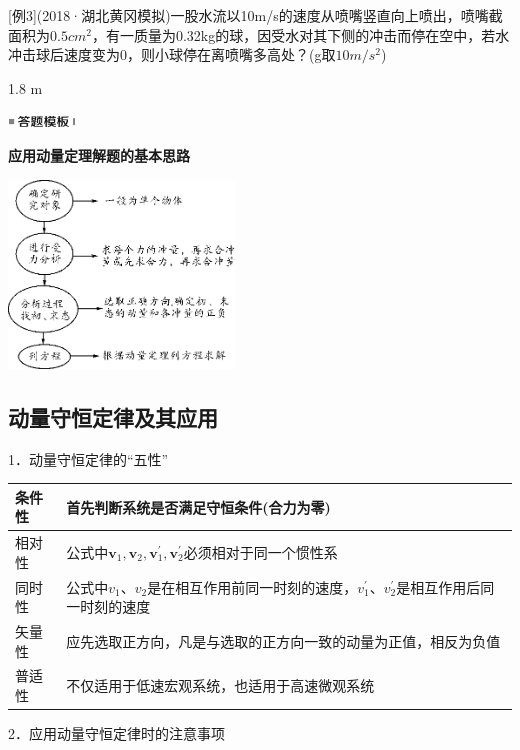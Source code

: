 {[}例3{]}(2018·湖北黄冈模拟)一股水流以10m/s的速度从喷嘴竖直向上喷出，喷嘴截面积为$0.5 cm^2$，有一质量为0.32kg的球，因受水对其下侧的冲击而停在空中，若水冲击球后速度变为0，则小球停在离喷嘴多高处？(g取$10m/s^2$)
\begin{solution}
	1.8 m
\end{solution}

\begin{center}\includegraphics[width=0.70764in,height=0.12292in]{media/image25.png}

\textbf{应用动量定理解题的基本思路}
\end{center}


\begin{center}\includegraphics[width=2.36806in,height=1.97153in]{media/image250.png}\end{center}

	

\subsection{动量守恒定律及其应用}

1．动量守恒定律的``五性''

\begin{longtable}[]{@{}ll@{}}
\toprule
条件性 & 首先判断系统是否满足守恒条件(合力为零)\tabularnewline
\midrule
\endhead
相对性 & 公式中$\boldsymbol{v}_{1}, \boldsymbol{v}_{2}, \boldsymbol{v}_{1}^{\prime}, \boldsymbol{v}_{2}^{\prime}$必须相对于同一个惯性系\tabularnewline
同时性 &
公式中$v_1$、$v_2$是在相互作用前同一时刻的速度，$v_1^\prime$、$v_2^\prime$是相互作用后同一时刻的速度\tabularnewline
矢量性 &
应先选取正方向，凡是与选取的正方向一致的动量为正值，相反为负值\tabularnewline
普适性 & 不仅适用于低速宏观系统，也适用于高速微观系统\tabularnewline
\bottomrule
\end{longtable}

2．应用动量守恒定律时的注意事项

